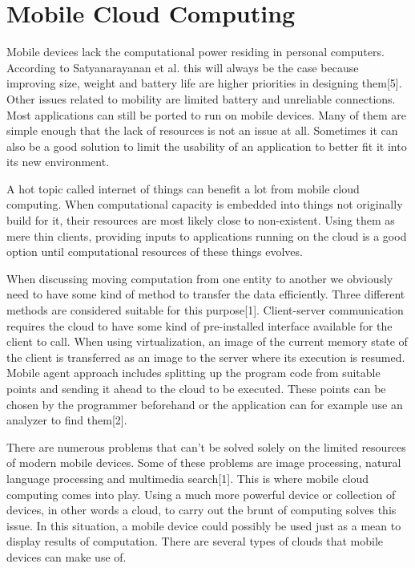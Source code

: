 \documentclass[conference]{IEEEtran}
\begin{document}
\section{Mobile Cloud Computing}
Mobile devices lack the computational power residing in personal computers. According to Satyanarayanan et al. this will always be the case because improving size, weight and battery life are higher priorities in designing them[5]. Other issues related to mobility are limited battery and unreliable connections. Most applications can still be ported to run on mobile devices. Many of them are simple enough that the lack of resources is not an issue at all. Sometimes it can also be a good solution to limit the usability of an application to better fit it into its new environment.
\par
A hot topic called internet of things can benefit a lot from mobile cloud computing. When computational capacity is embedded into things not originally build for it, their resources are most likely close to non-existent. Using them as mere thin clients, providing inputs to applications running on the cloud is a good option until computational resources of these things evolves.
\par
When discussing moving computation from one entity to another we obviously need to have some kind of method to transfer the data efficiently. Three different methods are considered suitable for this purpose[1]. Client-server communication requires the cloud to have some kind of pre-installed interface available for the client to call. When using virtualization, an image of the current memory state of the client is transferred as an image to the server where its execution is resumed. Mobile agent approach includes splitting up the program code from suitable points and sending it ahead to the cloud to be executed. These points can be chosen by the programmer beforehand or the application can for example use an analyzer to find them[2].
\par
There are numerous problems that can't be solved solely on the limited resources of modern mobile devices. Some of these problems are image processing, natural language processing and multimedia search[1]. This is where mobile cloud computing comes into play. Using a much more powerful device or collection of devices, in other words a cloud, to carry out the brunt of computing solves this issue. In this situation, a mobile device could possibly be used just as a mean to display results of computation. There are several types of clouds that mobile devices can make use of.\\
\end{document}

